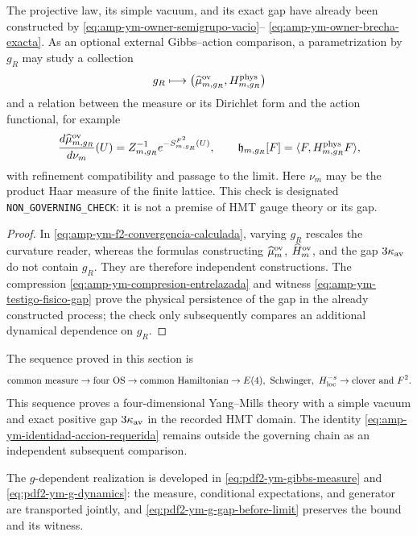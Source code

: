 \begin{proposition}
\label{prop:amp-ym-puente-accion-requerido}
The projective law, its simple vacuum, and its exact gap have already been constructed
by \eqref{eq:amp-ym-owner-semigrupo-vacio}--
\eqref{eq:amp-ym-owner-brecha-exacta}. As an optional external
Gibbs--action comparison, a parametrization by \(g_R\) may study a collection
\[
 g_R\longmapsto
 \bigl(\widehat\mu_{m,g_R}^{\rm ov},H_{m,g_R}^{\rm phys}\bigr)
\]
and a relation between the measure or its Dirichlet form and the action
functional, for example
\begin{equation}\label{eq:amp-ym-identidad-accion-requerida}
 \frac{d\widehat\mu_{m,g_R}^{\rm ov}}{d\nu_m}(U)
 =Z_{m,g_R}^{-1}e^{-S_{m,g_R}^{F^2}(U)},
 \qquad
 \mathfrak h_{m,g_R}[F]
 =\langle F,H_{m,g_R}^{\rm phys}F\rangle,
\end{equation}
with refinement compatibility and passage to the limit. Here \(\nu_m\) may
be the product Haar measure of the finite lattice. This check is designated
\texttt{NON\_GOVERNING\_CHECK}: it is not a premise of HMT gauge theory or
its gap.
\end{proposition}

\begin{proof}
In \eqref{eq:amp-ym-f2-convergencia-calculada}, varying \(g_R\) rescales the
curvature reader, whereas the formulas constructing
\(\widehat\mu_m^{\rm ov}\), \(\widehat H_m^{\rm ov}\), and the gap
\(3\kappa_{\rm av}\) do not contain \(g_R\). They are therefore independent
constructions. The compression
\eqref{eq:amp-ym-compresion-entrelazada} and witness
\eqref{eq:amp-ym-testigo-fisico-gap} prove the physical persistence of the
gap in the already constructed process; the check only subsequently compares an
additional dynamical dependence on \(g_R\).
\end{proof}

The sequence proved in this section is
\[
 \text{common measure}\to\text{four OS}\to\text{common Hamiltonian}
 \to E(4),\ \text{Schwinger},\ H^{-s}_{\rm loc}
 \to\text{clover and }F^2.
\]
This sequence proves a four-dimensional Yang--Mills theory with a simple
vacuum and exact positive gap \(3\kappa_{\rm av}\) in the recorded HMT
domain. The identity
\eqref{eq:amp-ym-identidad-accion-requerida} remains outside the governing
chain as an independent subsequent comparison.

The \(g\)-dependent realization is developed in
\eqref{eq:pdf2-ym-gibbs-measure} and
\eqref{eq:pdf2-ym-g-dynamics}: the measure, conditional
expectations, and generator are transported jointly,
and \eqref{eq:pdf2-ym-g-gap-before-limit} preserves the bound and its witness.
